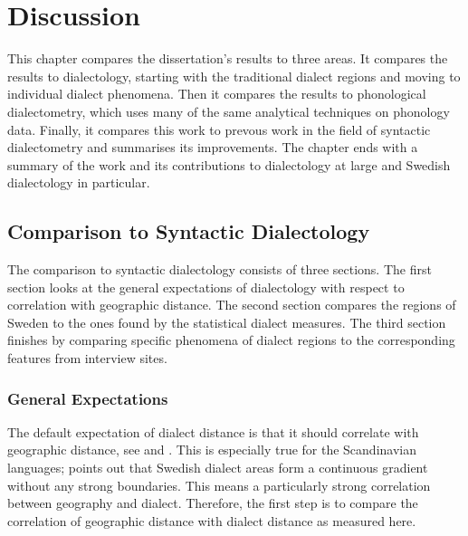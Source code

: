 \chapter{Discussion}

This chapter compares the dissertation's results to three areas. It
compares the results to dialectology, starting with the traditional
dialect regions and moving to individual dialect phenomena. Then it
compares the results to phonological dialectometry, which uses many of
the same analytical techniques on phonology data. Finally, it compares
this work to prevous work in the field of syntactic dialectometry and
summarises its improvements. The chapter ends with a summary of the
work and its contributions to dialectology at large and Swedish
dialectology in particular.



\section{Comparison to Syntactic Dialectology}

The comparison to syntactic dialectology consists of three
sections. The first section looks at the general expectations of
dialectology with respect to correlation with geographic distance. The
second section compares the regions of Sweden to the ones found by the
statistical dialect measures. The third section finishes by comparing
specific phenomena of dialect regions to the corresponding features
from interview sites.

\subsection{General Expectations}

The default expectation of dialect distance is that it should
correlate with geographic distance, see  and
. This is especially true for the Scandinavian
languages;  points out that Swedish dialect areas
form a continuous gradient without any strong boundaries. This means a
particularly strong correlation between geography and
dialect. Therefore, the first step is to compare the correlation of
geographic distance with dialect distance as measured
here.

